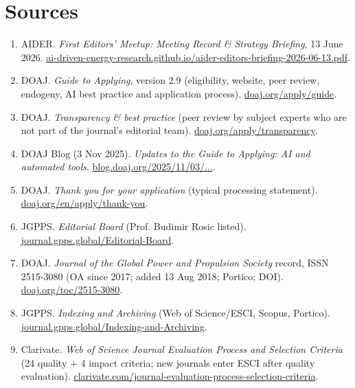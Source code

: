 \documentclass[11pt]{article}
\begin{document}
\section*{Sources}
{\footnotesize\color{ink2}\raggedright
\begin{enumerate}[leftmargin=1.6em, itemsep=1.5pt]
\item AIDER. \emph{First Editors' Meetup: Meeting Record \& Strategy Briefing}, 13 June 2026. \href{https://ai-driven-energy-research.github.io/aider-editors-briefing-2026-06-13.pdf}{ai-driven-energy-research.github.io/aider-editors-briefing-2026-06-13.pdf}.
\item DOAJ. \emph{Guide to Applying}, version 2.9 (eligibility, website, peer review, endogeny, AI best practice and application process). \href{https://doaj.org/apply/guide/}{doaj.org/apply/guide}.
\item DOAJ. \emph{Transparency \& best practice} (peer review by subject experts who are not part of the journal's editorial team). \href{https://doaj.org/apply/transparency/}{doaj.org/apply/transparency}.
\item DOAJ Blog (3 Nov 2025). \emph{Updates to the Guide to Applying: AI and automated tools}. \href{https://blog.doaj.org/2025/11/03/updates-to-the-guide-to-applying-flipped-journals-ai-quality-criteria-and-oa-exceptions/}{blog.doaj.org/2025/11/03/...}.
\item DOAJ. \emph{Thank you for your application} (typical processing statement). \href{https://doaj.org/en/apply/thank-you}{doaj.org/en/apply/thank-you}.
\item JGPPS. \emph{Editorial Board} (Prof. Budimir Rosic listed). \href{https://journal.gpps.global/Editorial-Board,1801.html}{journal.gpps.global/Editorial-Board}.
\item DOAJ. \emph{Journal of the Global Power and Propulsion Society} record, ISSN 2515-3080 (OA since 2017; added 13 Aug 2018; Portico; DOI). \href{https://doaj.org/toc/2515-3080}{doaj.org/toc/2515-3080}.
\item JGPPS. \emph{Indexing and Archiving} (Web of Science/ESCI, Scopus, Portico). \href{https://journal.gpps.global/Indexing-and-Archiving,1813.html}{journal.gpps.global/Indexing-and-Archiving}.
\item Clarivate. \emph{Web of Science Journal Evaluation Process and Selection Criteria} (24 quality + 4 impact criteria; new journals enter ESCI after quality evaluation). \href{https://clarivate.com/academia-government/scientific-and-academic-research/research-discovery-and-referencing/web-of-science/web-of-science-core-collection/editorial-selection-process/journal-evaluation-process-selection-criteria/}{clarivate.com/journal-evaluation-process-selection-criteria}.
\end{enumerate}}
\end{document}
